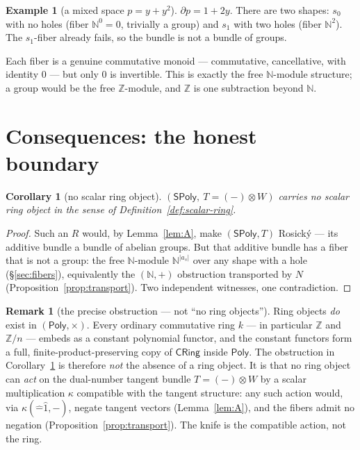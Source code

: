 \documentclass[11pt]{article}
\newtheorem{corollary}[theorem]{Corollary}
\theoremstyle{definition}
\newtheorem{remark}[theorem]{Remark}
\newtheorem{example}[theorem]{Example}
\newcommand{\SPoly}{\mathsf{SPoly}}
\newcommand{\Poly}{\mathsf{Poly}}
\newcommand{\CRing}{\mathsf{CRing}}
\newcommand{\N}{\mathbb{N}}
\newcommand{\Z}{\mathbb{Z}}
\begin{document}
\begin{example}[a mixed space $p=y+y^2$]
$\partial p=1+2y$. There are two shapes: $s_0$ with no holes (fiber $\N^0=0$, trivially a
group) and $s_1$ with two holes (fiber $\N^2$). The $s_1$-fiber already fails, so the
bundle is not a bundle of groups.
\end{example}

Each fiber is a genuine commutative monoid --- commutative, cancellative, with identity
$0$ --- but only $0$ is invertible. This is exactly the free $\N$-module structure; a group
would be the free $\Z$-module, and $\Z$ is one subtraction beyond $\N$.

\section{Consequences: the honest boundary}\label{sec:consequences}

\begin{corollary}[no scalar ring object]\label{cor:no-ring}
$(\SPoly,\ T=(-)\otimes W)$ carries no scalar ring object in the sense of
Definition~\ref{def:scalar-ring}.
\end{corollary}

\begin{proof}
Such an $R$ would, by Lemma~\ref{lem:A}, make $(\SPoly,T)$ Rosick\'y --- its additive
bundle a bundle of abelian groups. But that additive bundle has a fiber that is not a
group: the free $\N$-module $\N^{|a_s|}$ over any shape with a hole
(\S\ref{sec:fibers}), equivalently the $(\N,+)$ obstruction transported by $N$
(Proposition~\ref{prop:transport}). Two independent witnesses, one contradiction.
\end{proof}

\begin{remark}[the precise obstruction --- not ``no ring objects'']
Ring objects \emph{do} exist in $(\Poly,\times)$. Every ordinary commutative ring $k$ ---
in particular $\Z$ and $\Z/n$ --- embeds as a constant polynomial functor, and the
constant functors form a full, finite-product-preserving copy of $\CRing$ inside $\Poly$.
The obstruction in Corollary~\ref{cor:no-ring} is therefore \emph{not} the absence of a
ring object. It is that no ring object can \emph{act} on the dual-number tangent bundle
$T=(-)\otimes W$ by a scalar multiplication $\kappa$ compatible with the tangent structure:
any such action would, via $\kappa(\hat-\hat1,-)$, negate tangent vectors
(Lemma~\ref{lem:A}), and the fibers admit no negation
(Proposition~\ref{prop:transport}). The knife is the compatible action, not the ring.
\end{remark}
\end{document}
